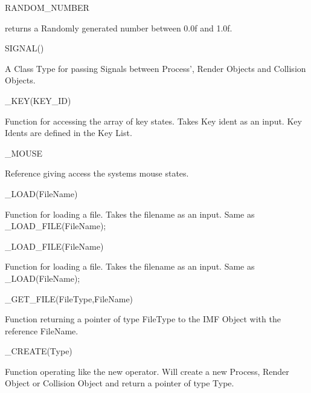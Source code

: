 \begin{DoxyItemize}
\item RANDOM\_\-NUMBER
\begin{DoxyItemize}
\item returns a Randomly generated number between 0.0f and 1.0f.
\end{DoxyItemize}
\item SIGNAL()
\begin{DoxyItemize}
\item A Class Type for passing Signals between Process', Render Objects and Collision Objects.
\end{DoxyItemize}
\item \_\-KEY(KEY\_\-ID)
\begin{DoxyItemize}
\item Function for accessing the array of key states. Takes Key ident as an input. Key Idents are defined in the Key List.
\end{DoxyItemize}
\item \_\-MOUSE
\begin{DoxyItemize}
\item Reference giving access the systems mouse states.
\end{DoxyItemize}
\item \_\-LOAD(FileName)
\begin{DoxyItemize}
\item Function for loading a file. Takes the filename as an input. Same as \_\-LOAD\_\-FILE(FileName);
\end{DoxyItemize}
\item \_\-LOAD\_\-FILE(FileName)
\begin{DoxyItemize}
\item Function for loading a file. Takes the filename as an input. Same as \_\-LOAD(FileName);
\end{DoxyItemize}
\item \_\-GET\_\-FILE(FileType,FileName)
\begin{DoxyItemize}
\item Function returning a pointer of type FileType to the IMF Object with the reference FileName.
\end{DoxyItemize}
\item \_\-CREATE(Type)
\begin{DoxyItemize}
\item Function operating like the new operator. Will create a new Process, Render Object or Collision Object and return a pointer of type Type.
\end{DoxyItemize}

\end{DoxyItemize}
